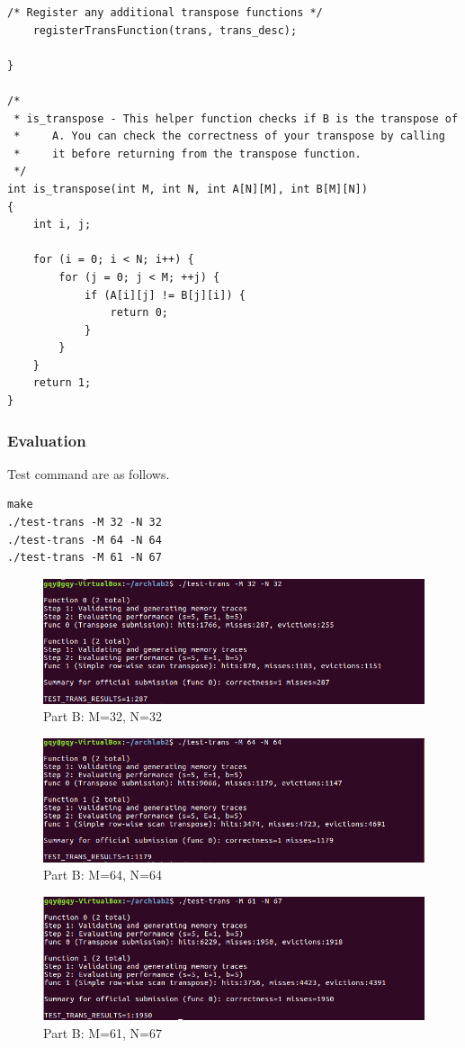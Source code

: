 \documentclass{article}
\begin{document}
\begin{lstlisting}[language={[ANSI]C}]
    /* Register any additional transpose functions */
    registerTransFunction(trans, trans_desc); 

}

/* 
 * is_transpose - This helper function checks if B is the transpose of
 *     A. You can check the correctness of your transpose by calling
 *     it before returning from the transpose function.
 */
int is_transpose(int M, int N, int A[N][M], int B[M][N])
{
    int i, j;

    for (i = 0; i < N; i++) {
        for (j = 0; j < M; ++j) {
            if (A[i][j] != B[j][i]) {
                return 0;
            }
        }
    }
    return 1;
}

\end{lstlisting}
\subsubsection{Evaluation}
Test command are as follows.
\begin{lstlisting}[language={[ANSI]C}]
make
./test-trans -M 32 -N 32
./test-trans -M 64 -N 64
./test-trans -M 61 -N 67
\end{lstlisting}
\begin{figure}[htbp]
		\centering
		\includegraphics{B1}
		\caption{Part B: M=32, N=32} \label{Part B: M=32, N=32}
\end{figure}
\begin{figure}[htbp]
		\centering
		\includegraphics{B2}
		\caption{Part B: M=64, N=64} \label{Part B: M=64, N=64}
\end{figure}
\begin{figure}[htbp]
		\centering
		\includegraphics{B3}
		\caption{Part B: M=61, N=67} \label{Part B: M=61, N=67}
\end{figure}
\end{document}
